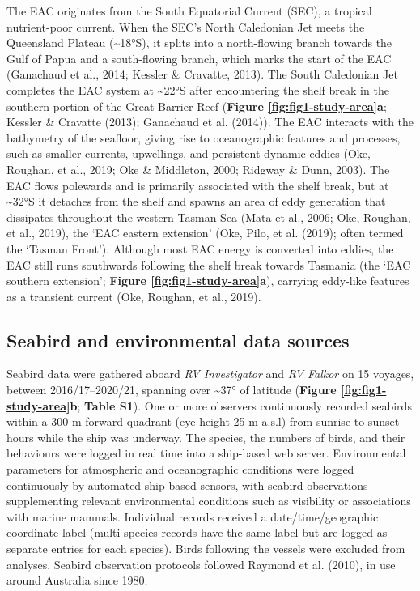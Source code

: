 \documentclass{article}
\begin{document}
\begin{linenumbers}
The EAC originates from the South Equatorial Current (SEC), a tropical nutrient-poor current. When the SEC's North Caledonian Jet meets the Queensland Plateau (\textasciitilde18°S), it splits into a north-flowing branch towards the Gulf of Papua and a south-flowing branch, which marks the start of the EAC (Ganachaud et al., 2014; Kessler \& Cravatte, 2013). The South Caledonian Jet completes the EAC system at \textasciitilde22°S after encountering the shelf break in the southern portion of the Great Barrier Reef (\textbf{Figure \ref{fig:fig1-study-area}a}; Kessler \& Cravatte (2013); Ganachaud et al. (2014)). The EAC interacts with the bathymetry of the seafloor, giving rise to oceanographic features and processes, such as smaller currents, upwellings, and persistent dynamic eddies (Oke, Roughan, et al., 2019; Oke \& Middleton, 2000; Ridgway \& Dunn, 2003). The EAC flows polewards and is primarily associated with the shelf break, but at \textasciitilde32°S it detaches from the shelf and spawns an area of eddy generation that dissipates throughout the western Tasman Sea (Mata et al., 2006; Oke, Roughan, et al., 2019), the `EAC eastern extension' (Oke, Pilo, et al. (2019); often termed the `Tasman Front'). Although most EAC energy is converted into eddies, the EAC still runs southwards following the shelf break towards Tasmania (the `EAC southern extension'; \textbf{Figure \ref{fig:fig1-study-area}a}), carrying eddy-like features as a transient current (Oke, Roughan, et al., 2019).

\hypertarget{seabird-and-environmental-data-sources}{%
\subsection{Seabird and environmental data sources}\label{seabird-and-environmental-data-sources}}

Seabird data were gathered aboard \emph{RV Investigator} and \emph{RV Falkor} on 15 voyages, between 2016/17--2020/21, spanning over \textasciitilde37° of latitude (\textbf{Figure \ref{fig:fig1-study-area}b}; \textbf{Table S1}). One or more observers continuously recorded seabirds within a 300 m forward quadrant (eye height 25 m a.s.l) from sunrise to sunset hours while the ship was underway. The species, the numbers of birds, and their behaviours were logged in real time into a ship-based web server. Environmental parameters for atmospheric and oceanographic conditions were logged continuously by automated-ship based sensors, with seabird observations supplementing relevant environmental conditions such as visibility or associations with marine mammals. Individual records received a date/time/geographic coordinate label (multi-species records have the same label but are logged as separate entries for each species). Birds following the vessels were excluded from analyses. Seabird observation protocols followed Raymond et al. (2010), in use around Australia since 1980.


\end{linenumbers}
\end{document}
